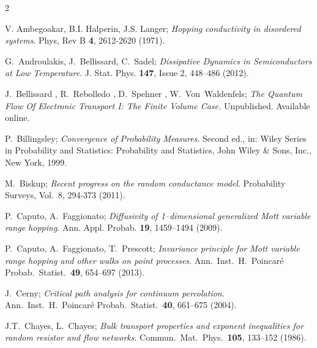 \documentclass[12pt,a4paper,reqno]{amsart}
\begin{document}
\begin{thebibliography}{2}



 V. Ambegoakar, B.I. Halperin, J.S. Langer; \emph{Hopping conductivity in disordered systems}. Phys, Rev B {\bf 4}, 2612-2620 (1971).



G.~Androulakis, J.~Bellissard, C.~Sadel;
\emph{Dissipative Dynamics in Semiconductors at Low Temperature}. J. Stat. Phys. {\bf 147}, 
Issue 2,  448--486 (2012). 



  J.~Bellissard , R.~Rebolledo , D.~Spehner , W.~Von~Waldenfels;
\emph{The Quantum Flow Of Electronic Transport I: The Finite Volume Case.} Unpublished. Available online.



 P.~Billingsley; \emph{Convergence of Probability Measures}.  Second ed., in: Wiley Series in Probability and Statistics: Probability and Statistics, John Wiley \& Sons, Inc., New York, 1999.


 M.~Biskup; \emph{Recent progress on the random conductance model}.  
Probability Surveys, Vol.~8,  294-373
(2011).





   P.~Caputo, A.~Faggionato; \emph{Diffusivity of 1--dimensional
generalized Mott variable range hopping}. Ann. Appl. Probab. {\bf
19}, 1459--1494 (2009).	


P.~Caputo, A.~Faggionato, T.~Prescott; \emph{Invariance principle for Mott variable range hopping and other walks on point processes}. Ann.~Inst.~H.~Poincar\'{e} Probab.~Statist.~{\bf 49}, 654--697 (2013).
%
%

 J.~Cerny;  \emph{Critical path analysis for continuum percolation}.  Ann.~Inst.~H.~Poincar\'{e} Probab.~Statist.~{\bf 40}, 661--675 (2004).

 J.T.~Chayes, L.~Chayes; \emph{Bulk transport properties and exponent inequalities for random resistor and flow  networks}. Commun.~Mat.~Phys.~{\bf 105}, 133--152 (1986).


\end{thebibliography}
\end{document}
